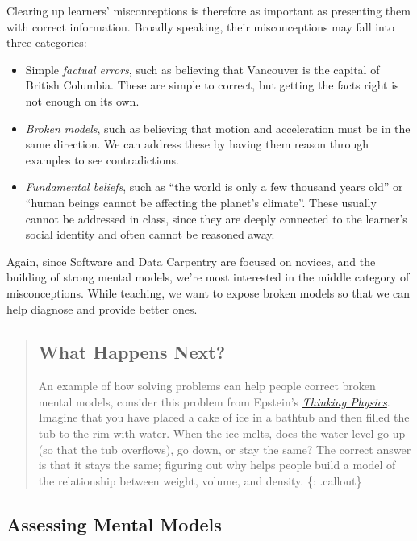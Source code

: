 Clearing up learners' misconceptions is therefore as important as
presenting them with correct information. Broadly speaking, their
misconceptions may fall into three categories:

\begin{itemize}
\item
  Simple \emph{factual errors}, such as believing that Vancouver is the
  capital of British Columbia. These are simple to correct, but getting
  the facts right is not enough on its own.
\item
  \emph{Broken models}, such as believing that motion and acceleration
  must be in the same direction. We can address these by having them
  reason through examples to see contradictions.
\item
  \emph{Fundamental beliefs}, such as ``the world is only a few thousand
  years old'' or ``human beings cannot be affecting the planet's
  climate''. These usually cannot be addressed in class, since they are
  deeply connected to the learner's social identity and often cannot be
  reasoned away.
\end{itemize}

Again, since Software and Data Carpentry are focused on novices, and the
building of strong mental models, we're most interested in the middle
category of misconceptions. While teaching, we want to expose broken
models so that we can help diagnose and provide better ones.

\begin{quote}
\subsection{What Happens Next?}\label{what-happens-next}

An example of how solving problems can help people correct broken mental
models, consider this problem from Epstein's
\emph{\href{http://www.amazon.com/Thinking-Physics-Understandable-Practical-Reality/dp/0935218084/r}{Thinking
Physics}}. Imagine that you have placed a cake of ice in a bathtub and
then filled the tub to the rim with water. When the ice melts, does the
water level go up (so that the tub overflows), go down, or stay the
same? The correct answer is that it stays the same; figuring out why
helps people build a model of the relationship between weight, volume,
and density. \{: .callout\}
\end{quote}

\subsection{Assessing Mental Models}\label{assessing-mental-models}

